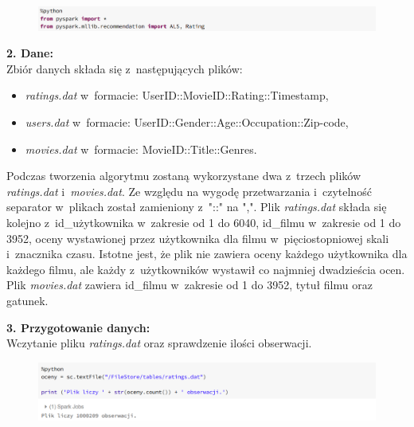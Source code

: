 \documentclass[12pt,a4paper]{report}
\begin{document}
\begin{figure}[H]
\includegraphics[scale=0.5]{obrazy/ALS1.PNG} 
\end{figure}

\textbf{2. Dane:}
\\Zbiór danych składa się z~następujących plików: 
\begin{itemize}
\item \textit{ratings.dat} w~formacie: UserID::MovieID::Rating::Timestamp,
\item \textit{users.dat} w~formacie: UserID::Gender::Age::Occupation::Zip-code,
\item \textit{movies.dat} w~formacie: MovieID::Title::Genres.
\end{itemize}
Podczas tworzenia algorytmu zostaną wykorzystane dwa z~trzech plików \textit{ratings.dat} i~\textit{movies.dat}. 
Ze względu na wygodę przetwarzania i~czytelność separator w~plikach został zamieniony z~"::" na ",".
Plik \textit{ratings.dat} składa się kolejno z~id\_użytkownika w~zakresie od 1 do 6040, id\_filmu w~zakresie od 1 do 3952, oceny wystawionej przez użytkownika dla filmu w~pięciostopniowej skali i~znacznika czasu. Istotne jest, że plik nie zawiera oceny każdego użytkownika dla każdego filmu, ale każdy z~użytkowników wystawił co najmniej dwadzieścia ocen.
Plik \textit{movies.dat} zawiera id\_filmu w~zakresie od 1 do 3952, tytuł filmu oraz gatunek.
\bigskip

\textbf{3. Przygotowanie danych:}
\\Wczytanie pliku \textit{ratings.dat} oraz sprawdzenie ilości obserwacji.

\begin{figure}[H]
\includegraphics[scale=0.5]{obrazy/ALS2.PNG} 
\end{figure}
\end{document}

